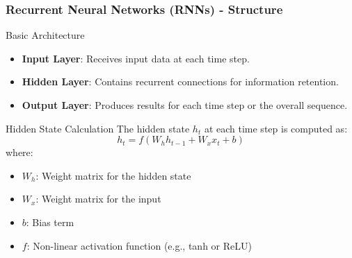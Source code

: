 \documentclass[aspectratio=169]{beamer}
\begin{document}
\begin{frame}[fragile]
    \frametitle{Recurrent Neural Networks (RNNs) - Structure}
    \begin{block}{Basic Architecture}
        \begin{itemize}
            \item \textbf{Input Layer}: Receives input data at each time step.
            \item \textbf{Hidden Layer}: Contains recurrent connections for information retention.
            \item \textbf{Output Layer}: Produces results for each time step or the overall sequence.
        \end{itemize}
    \end{block}

    \begin{block}{Hidden State Calculation}
        The hidden state \( h_t \) at each time step is computed as:
        \begin{equation}
        h_t = f(W_h h_{t-1} + W_x x_t + b)
        \end{equation}
        where:
        \begin{itemize}
            \item \( W_h \): Weight matrix for the hidden state
            \item \( W_x \): Weight matrix for the input
            \item \( b \): Bias term
            \item \( f \): Non-linear activation function (e.g., tanh or ReLU)
        \end{itemize}
    \end{block}
\end{frame}
\end{document}
